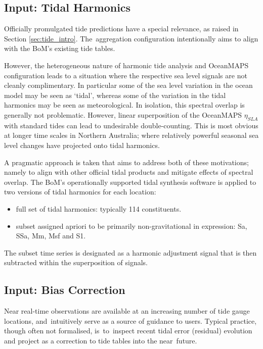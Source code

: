 \subsection{Input: Tidal Harmonics }
\label{sec:harmonics}
Officially promulgated tide predictions have a special relevance, as raised in Section \ref{sec:tide_intro}.
The~aggregation configuration intentionally aims to align with the BoM's existing tide tables. 

However, the heterogeneous nature of harmonic tide analysis and OceanMAPS configuration leads to a situation where the respective sea level signals are not cleanly complimentary.
In particular some of the sea level variation in the ocean model may be seen as `tidal', whereas some of the variation in the tidal harmonics may be seen as meteorological.   
In isolation, this spectral overlap is generally not problematic. 
However, linear superposition of the OceanMAPS $\eta_{SLA}$ with standard tides can lead to undesirable double-counting. 
This is most obvious at longer time scales in Northern Australia; where relatively powerful seasonal sea level changes have projected onto tidal harmonics.


A pragmatic approach is taken that aims to address both of these motivations; namely to align with other official tidal products and mitigate effects of spectral overlap.
The BoM's operationally supported tidal synthesis software is applied to two versions of tidal harmonics for each location:
\begin{itemize}[leftmargin=*]%
  \item full set of tidal harmonics: typically 114 constituents.
  \item subset assigned apriori to be primarily non-gravitational in expression: Sa, SSa, Mm, Msf and S1.
\end{itemize}

The subset time series is designated as a harmonic adjustment signal that is then subtracted within the superposition of signals. 


\subsection{Input: Bias Correction}
\label{sec:bias}
Near real-time observations are available at an increasing number of tide gauge locations, and~intuitively serve as a source of guidance to users.
Typical practice, though often not formalised, is~to~inspect recent tidal error (residual) evolution and project as a correction to tide tables into the near~future.

